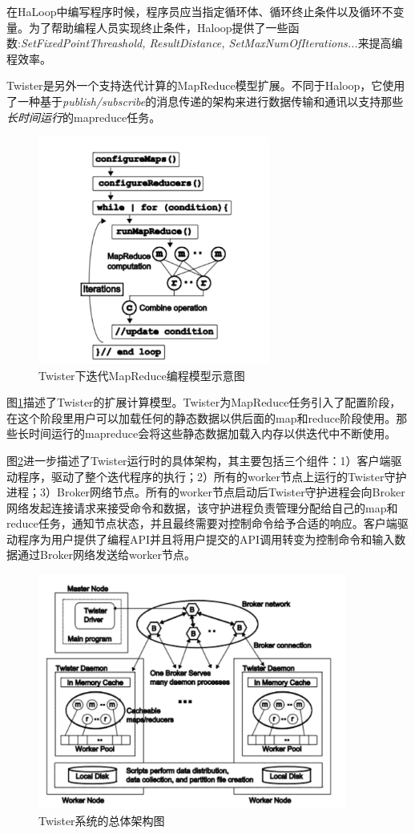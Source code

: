 在HaLoop中编写程序时候，程序员应当指定循环体、循环终止条件以及循环不变量。为了帮助编程人员实现终止条件，Haloop提供了一些函数:\textit{SetFixedPointThreashold, ResultDistance, SetMaxNumOfIterations...}来提高编程效率。


Twister\cite{ekanayake2010twister}是另外一个支持迭代计算的MapReduce模型扩展。不同于Haloop，它使用了一种基于\textit{publish/subscribe}的消息传递的架构来进行数据传输和通讯以支持那些\textit{长时间运行}的mapreduce任务。

\begin{figure}[h!]
\centering
\includegraphics[width=3in]{../figures/twister.pdf}
\caption{Twister下迭代MapReduce编程模型示意图}
\label{fig:twister}
\end{figure}

图\ref{fig:twister}描述了Twister的扩展计算模型。Twister为MapReduce任务引入了配置阶段，在这个阶段里用户可以加载任何的静态数据以供后面的map和reduce阶段使用。那些长时间运行的mapreduce会将这些静态数据加载入内存以供迭代中不断使用。

图\ref{fig:twisterarch}进一步描述了Twister运行时的具体架构，其主要包括三个组件：1）客户端驱动程序，驱动了整个迭代程序的执行；2）所有的worker节点上运行的Twister守护进程；3）Broker网络节点。所有的worker节点启动后Twister守护进程会向Broker网络发起连接请求来接受命令和数据，该守护进程负责管理分配给自己的map和reduce任务，通知节点状态，并且最终需要对控制命令给予合适的响应。客户端驱动程序为用户提供了编程API并且将用户提交的API调用转变为控制命令和输入数据通过Broker网络发送给worker节点。

\begin{figure}[]
\centering
\includegraphics[width=4in]{../figures/twisterarch.pdf}
\caption{Twister系统的总体架构图}
\label{fig:twisterarch}
\end{figure}


